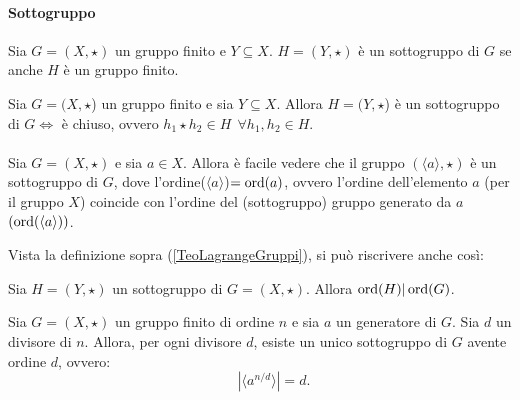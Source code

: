 \paragraph{Sottogruppo}
    Sia $G=(X,\star)$ un gruppo finito e $Y \subseteq X$. $H=(Y,\star)$ è un sottogruppo di $G$ se anche $H$ è un gruppo finito. 
 

\begin{theorem}
    Sia $G=(X,\star$) un gruppo finito e sia $Y \subseteq X$. Allora $H=(Y,\star$) è un sottogruppo di $G \iff$ è chiuso, ovvero $h_1 \star h_2 \in H \ \ \forall h_1, h_2 \in H$.  
\end{theorem} 

\paragraph{}
    Sia $G=(X,\star)$ e sia $a \in X$. Allora è facile vedere che il gruppo $(\langle a\rangle, \star)$ è un sottogruppo di $G$, dove l'ordine($\langle a\rangle$)$=\operatorname{ord}(a)$, ovvero l'ordine dell'elemento $a$ (per il gruppo $X$) coincide con l'ordine del (sottogruppo) gruppo generato da $a$ $(\operatorname{ord}(\langle a \rangle))$.


Vista la definizione sopra (\ref{TeoLagrangeGruppi}), si può riscrivere anche così:
\begin{theorem}
    Sia $H=(Y,\star)$ un sottogruppo di $G=(X,\star)$. Allora $\operatorname{ord}(H)|\operatorname{ord}(G)$. 
\end{theorem}

\begin{theorem} 
    Sia $G=(X,\star)$ un gruppo finito di ordine $n$ e sia $a$ un generatore di $G$. Sia $d$ un divisore di $n$. Allora, per ogni divisore $d$, esiste un unico sottogruppo di $G$ avente ordine $d$, ovvero:
    \[
    \qquad |\langle a^{n/d} \rangle| = d.
\]
\end{theorem}




